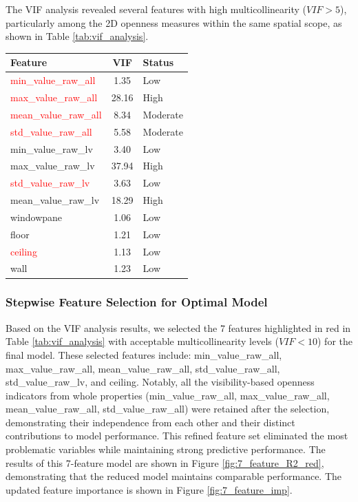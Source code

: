 The VIF analysis revealed several features with high multicollinearity ($VIF > 5$), particularly among 
the 2D openness measures within the same spatial scope, as shown in Table \ref{tab:vif_analysis}.
\begin{center}
    \begin{tabular}{l|c|l}
    \hline
    Feature & VIF & Status \\
    \hline
    \textcolor{red}{min\_value\_raw\_all} & 1.35 & Low \\
    \textcolor{red}{max\_value\_raw\_all} & 28.16 & High \\
    \textcolor{red}{mean\_value\_raw\_all} & 8.34 & Moderate \\
    \textcolor{red}{std\_value\_raw\_all} & 5.58 & Moderate \\
    min\_value\_raw\_lv & 3.40 & Low \\
    max\_value\_raw\_lv & 37.94 & High \\
    \textcolor{red}{std\_value\_raw\_lv} & 3.63 & Low \\
    mean\_value\_raw\_lv & 18.29 & High \\
    windowpane & 1.06 & Low \\
    floor & 1.21 & Low \\
    \textcolor{red}{ceiling} & 1.13 & Low \\
    wall & 1.23 & Low \\
    \hline
    \end{tabular}
    \label{tab:vif_analysis}
\end{center}

\subsubsection{Stepwise Feature Selection for Optimal Model}
Based on the VIF analysis results, we selected the 7 features highlighted in red in Table \ref{tab:vif_analysis} 
with acceptable multicollinearity levels ($VIF < 10$) for the final model. These selected features include: 
min\_value\_raw\_all, max\_value\_raw\_all, mean\_value\_raw\_all, std\_value\_raw\_all, std\_value\_raw\_lv, 
and ceiling. Notably, all the visibility-based openness indicators from whole properties 
(min\_value\_raw\_all, max\_value\_raw\_all, mean\_value\_raw\_all, std\_value\_raw\_all) were retained 
after the selection, demonstrating their independence from each other and their distinct contributions 
to model performance. This refined feature set eliminated the most problematic variables while 
maintaining strong predictive performance. The results of this 7-feature model are shown in 
Figure \ref{fig:7_feature_R2_red}, demonstrating that the reduced model maintains comparable 
performance. The updated feature importance is shown in Figure \ref{fig:7_feature_imp}.

